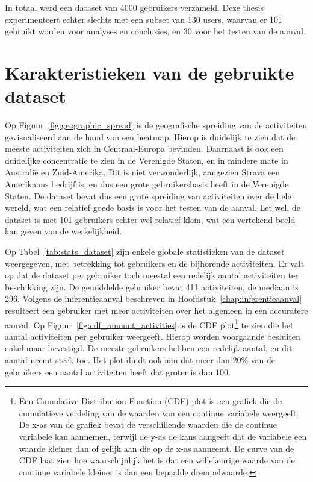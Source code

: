 In totaal werd een dataset van 4000 gebruikers verzameld. Deze thesis
experimenteert echter slechts met een subset van 130 users, waarvan er 101
gebruikt worden voor analyses en conclusies, en 30 voor het testen van de
aanval.

\section{Karakteristieken van de gebruikte dataset}
Op Figuur~\ref{fig:geographic_spread} is de geografische spreiding van de
activiteiten gevisualiseerd aan de hand van een heatmap. Hierop is duidelijk te
zien dat de meeste activiteiten zich in Centraal-Europa bevinden. Daarnaast is
ook een duidelijke concentratie te zien in de Verenigde Staten, en in mindere
mate in Australië en Zuid-Amerika. Dit is niet verwonderlijk, aangezien Strava
een Amerikaans bedrijf is, en dus een grote gebruikersbasis heeft in de
Verenigde Staten. De dataset bevat dus een grote spreiding van activiteiten
over de hele wereld, wat een relatief goede basis is voor het testen van de
aanval. Let wel, de dataset is met 101 gebruikers echter wel relatief klein,
wat een vertekend beeld kan geven van de werkelijkheid.

Op Tabel~\ref{tab:stats_dataset} zijn enkele globale statistieken van de
dataset weergegeven, met betrekking tot gebruikers en de bijhorende
activiteiten. Er valt op dat de dataset per gebruiker toch meestal een redelijk
aantal activiteiten ter beschikking zijn. De gemiddelde gebruiker bevat 411
activiteiten, de mediaan is 296. Volgens de inferentieaanval beschreven in
Hoofdstuk~\ref{chap:inferentieaanval} resulteert een gebruiker met meer
activiteiten over het algemeen in een accuratere aanval. Op
Figuur~\ref{fig:cdf_amount_activities} is de \ac{CDF} plot\footnote{Een
    Cumulative Distribution Function (CDF) plot is een grafiek die de cumulatieve
    verdeling van de waarden van een continue variabele
    weergeeft\cite{CursusSt38:online}. De x-as van de grafiek bevat de
    verschillende waarden die de continue variabele kan aannemen, terwijl de y-as
    de kans aangeeft dat de variabele een waarde kleiner dan of gelijk aan die op
    de x-as aanneemt. De curve van de CDF laat zien hoe waarschijnlijk het is dat
    een willekeurige waarde van de continue variabele kleiner is dan een bepaalde
    drempelwaarde.} te zien die het aantal activiteiten per gebruiker weergeeft.
Hierop worden voorgaande besluiten enkel maar bevestigd. De meeste gebruikers
hebben een redelijk aantal, en dit aantal neemt sterk toe. Het plot duidt ook
aan dat meer dan 20\% van de gebruikers een aantal activiteiten heeft dat
groter is dan 100.

